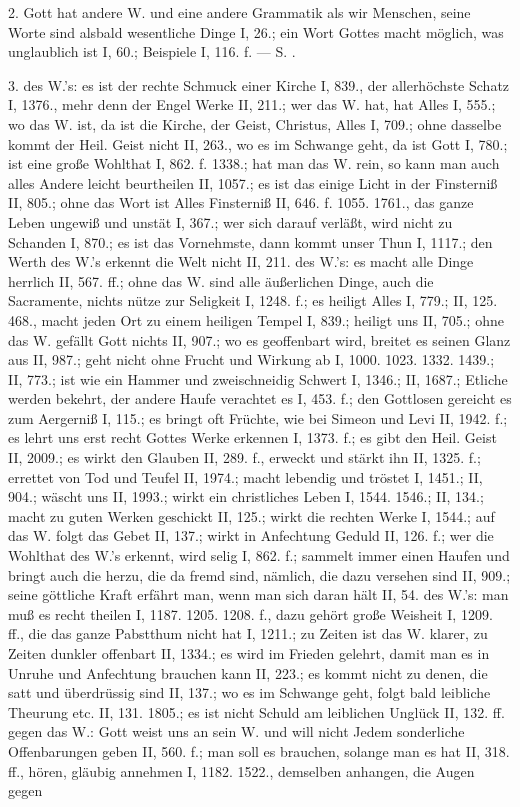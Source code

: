 2.  Gott hat andere W. und eine andere Grammatik als wir Menschen, seine Worte sind alsbald wesentliche Dinge I, 26.; ein Wort Gottes macht möglich, was unglaublich ist I, 60.; Beispiele I, 116. f. — S. .

3.  des W.’s: es ist der rechte Schmuck einer Kirche I, 839., der allerhöchste Schatz I, 1376., mehr denn der Engel Werke II, 211.; wer das W. hat, hat Alles I, 555.; wo das W. ist, da ist die Kirche, der Geist, Christus, Alles I, 709.; ohne dasselbe kommt der Heil. Geist nicht II, 263., wo es im Schwange geht, da ist Gott I, 780.; ist eine große Wohlthat I, 862. f. 1338.; hat man das W. rein, so kann man auch alles Andere leicht beurtheilen II, 1057.; es ist das einige Licht in der Finsterniß II, 805.; ohne das Wort ist Alles Finsterniß II, 646. f. 1055. 1761., das ganze Leben ungewiß und unstät I, 367.; wer sich darauf verläßt, wird nicht zu Schanden I, 870.; es ist das Vornehmste, dann kommt unser Thun I, 1117.; den Werth des W.’s erkennt die Welt nicht II, 211.  des W.’s: es macht alle Dinge herrlich II, 567. ff.; ohne das W. sind alle äußerlichen Dinge, auch die Sacramente, nichts nütze zur Seligkeit I, 1248. f.; es heiligt Alles I, 779.; II, 125. 468., macht jeden Ort zu einem heiligen Tempel I, 839.; heiligt uns II, 705.; ohne das W. gefällt Gott nichts II, 907.; wo es geoffenbart wird, breitet es seinen Glanz aus II, 987.; geht nicht ohne Frucht und Wirkung ab I, 1000. 1023. 1332. 1439.; II, 773.; ist wie ein Hammer und zweischneidig Schwert I, 1346.; II, 1687.; Etliche werden bekehrt, der andere Haufe verachtet es I, 453. f.; den Gottlosen gereicht es zum Aergerniß I, 115.; es bringt oft Früchte, wie bei Simeon und Levi II, 1942. f.; es lehrt uns erst recht Gottes Werke erkennen I, 1373. f.; es gibt den Heil. Geist II, 2009.; es wirkt den Glauben II, 289. f., erweckt und stärkt ihn II, 1325. f.; errettet von Tod und Teufel II, 1974.; macht lebendig und tröstet I, 1451.; II, 904.; wäscht uns II, 1993.; wirkt ein christliches Leben I, 1544. 1546.; II, 134.; macht zu guten Werken geschickt II, 125.; wirkt die rechten Werke I, 1544.; auf das W. folgt das Gebet II, 137.; wirkt in Anfechtung Geduld II, 126. f.; wer die Wohlthat des W.’s erkennt, wird selig I, 862. f.; sammelt immer einen Haufen und bringt auch die herzu, die da fremd sind, nämlich, die dazu versehen sind II, 909.; seine göttliche Kraft erfährt man, wenn man sich daran hält II, 54.  des W.’s: man muß es recht theilen I, 1187. 1205. 1208. f., dazu gehört große Weisheit I, 1209. ff., die das ganze Pabstthum nicht hat I, 1211.; zu Zeiten ist das W. klarer, zu Zeiten dunkler offenbart II, 1334.; es wird im Frieden gelehrt, damit man es in Unruhe und Anfechtung brauchen kann II, 223.; es kommt nicht zu denen, die satt und überdrüssig sind II, 137.; wo es im Schwange geht, folgt bald leibliche Theurung etc. II, 131. 1805.; es ist nicht Schuld am leiblichen Unglück II, 132. ff.  gegen das W.: Gott weist uns an sein W. und will nicht Jedem sonderliche Offenbarungen geben II, 560. f.; man soll es brauchen, solange man es hat II, 318. ff., hören, gläubig annehmen I, 1182. 1522., demselben anhangen, die Augen gegen 